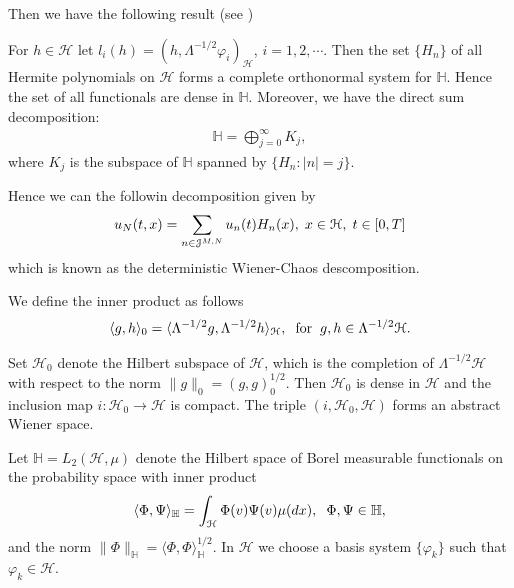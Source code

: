 	Then we have the following result (see \cite{DAPRATO1994})
	\begin{lemma}
	\label{dense}	
		For $h \in \mathcal{H}$ let $l_i (h) = (h, \Lambda^{-1/2} \varphi_i )_{\mathcal{H}}$, $i=1, 2, \cdots$. Then the set $\{H_n \}$ of all Hermite polynomials on $\mathcal{H}$ forms a complete orthonormal system for $\mathbb{H}$. Hence the set of all functionals are dense in $\mathbb{H}$. Moreover, we have the direct sum decomposition:
		\begin{align*}
		\mathbb{H} = \displaystyle \bigoplus^{\infty}_{j=0} K_j,
		\end{align*}
		where $K_j$ is the subspace of $\mathbb{H}$ spanned by $\{H_n : |n| = j \}$.
	\end{lemma}

	Hence we can the followin decomposition given by 
	\begin{align}
		u_N (t, x) = \displaystyle \sum _{n \in \mathcal{J}^{M, N}} u_{n}(t) H_n (x), \hspace{0.1cm} x \in \mathcal{H}, \hspace{0.1cm} t \in [0, T]
	\end{align}    
	which is known as the deterministic Wiener-Chaos descomposition. 
	
	We define the inner product as follows
	\begin{align*}
		\langle g, h \rangle_0 = \langle \Lambda^{-1/2} g, \Lambda^{-1/2} h \rangle_{\mathcal{H}}, \hspace{2mm} \text{for} \hspace{2mm} g, h \in \Lambda^{-1/2} \mathcal{H}.
	\end{align*}
	
	Set $\mathcal{H}_0$ denote the Hilbert subspace of $\mathcal{H}$, which is the completion of $\Lambda^{-1/2} \mathcal{H}$ with respect to the norm $\| g \|_0 = (g, g)_0^{1/2}$. Then $\mathcal{H}_0$ is dense in $\mathcal{H}$ and the inclusion map $i: \mathcal{H}_0 \longrightarrow \mathcal{H}$ is compact. The triple $(i, \mathcal{H}_0 , \mathcal{H})$ forms an abstract Wiener space. 
	
	Let $\mathbb{H} = L_2 (\mathcal{H}, \mu)$ denote the Hilbert space of Borel measurable functionals on the probability space with inner product
	\begin{align}
		\langle \Phi, \Psi \rangle_{\mathbb{H}} = \displaystyle \int_{\mathcal{H}} \Phi (v) \Psi (v) \mu (dx), \hspace{2mm} \Phi, \Psi \in \mathbb{H},
	\end{align}
	and the norm $\| \Phi \|_{\mathbb{H}} = \langle \Phi, \Phi\rangle_{\mathbb{H}}^{1/2}$. In $\mathcal{H}$ we choose a basis system $\{\varphi_k \}$ such that $\varphi_k \in \mathcal{H}$.\\
	
